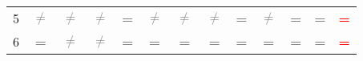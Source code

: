 \begin{table}
\begin{center}
\begin{tabular}{ccccccccccccc}
\multicolumn{1}{c}{5} & \textcolor{gray}{\textbf{$\neq$}} & \textcolor{gray}{\textbf{$\neq$}} & \textcolor{gray}{\textbf{$\neq$}} & \textcolor{gray}{\textbf{=}} & \textcolor{gray}{\textbf{$\neq$}} & \textcolor{gray}{\textbf{$\neq$}} & \textcolor{gray}{\textbf{$\neq$}} & \textcolor{gray}{\textbf{=}} & \textcolor{gray}{\textbf{$\neq$}} & \textcolor{gray}{\textbf{=}} & \textcolor{gray}{\textbf{=}} & \textcolor{red}{\textbf{=}} \\ 
\multicolumn{1}{c}{6} & \textcolor{gray}{\textbf{=}} & \textcolor{gray}{\textbf{$\neq$}} & \textcolor{gray}{\textbf{$\neq$}} & \textcolor{gray}{\textbf{=}} & \textcolor{gray}{\textbf{=}} & \textcolor{gray}{\textbf{=}} & \textcolor{gray}{\textbf{=}} & \textcolor{gray}{\textbf{=}} & \textcolor{gray}{\textbf{=}} & \textcolor{gray}{\textbf{=}} & \textcolor{gray}{\textbf{=}} & \textcolor{red}{\textbf{=}} \\ 
\bottomrule
\end{tabular}
\end{center}
\end{table}